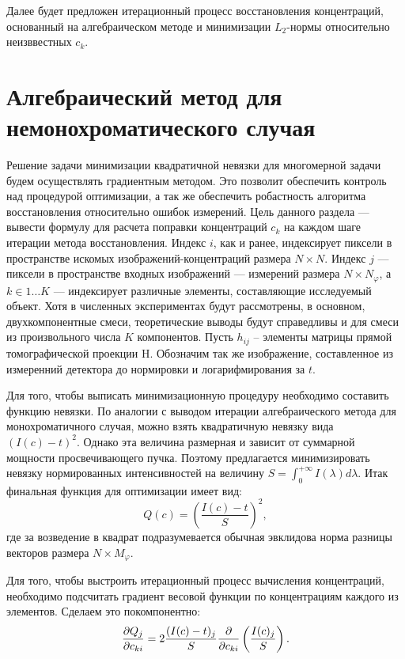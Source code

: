 Далее будет предложен итерационный процесс восстановления концентраций, основанный на алгебраическом методе и минимизации $L_2$-нормы относительно неизввестных $c_k$.

\section{Алгебраический метод для немонохроматического случая}
Решение задачи минимизации квадратичной невязки для многомерной задачи будем осуществлять градиентным методом.
Это позволит обеспечить контроль над процедурой оптимизации, а так же обеспечить робастность алгоритма восстановления относительно ошибок измерений.
Цель данного раздела --- вывести формулу для расчета поправки концентраций $c_k$ на каждом шаге итерации метода восстановления.
Индекс $i$, как и ранее, индексирует пиксели в пространстве искомых изображений-концентраций размера $N \times N$.
Индекс $j$ --- пиксели в пространстве входных изображений --- измерений размера $N \times N_\varphi$, а $k \in 1 \dots K$ --- индексирует различные элементы, составляющие исследуемый объект.
Хотя в численных экспериментах будут рассмотрены, в основном, двухкомпонентные смеси, теоретические выводы будут справедливы и для смеси из произвольного числа $K$ компонентов.
Пусть $h_{ij}$ – элементы матрицы прямой томографической проекции H.
Обозначим так же изображение, составленное из измеренний детектора до нормировки и логарифмирования за $t$.

Для того, чтобы выписать минимизационную процедуру необходимо составить функцию невязки.
По аналогии с выводом итерации алгебраического метода для монохроматичного случая, можно взять квадратичную невязку вида $(I(c) - t)^2$.
Однако эта величина размерная и зависит от суммарной мощности просвечивающего пучка.
Поэтому предлагается минимизировать невязку нормированных интенсивностей на величину $ S = \int_0^{+\infty}{I(\lambda)d\lambda}$.
Итак финальная функция для оптимизации имеет вид:
\begin{equation}
\label{eq:white_cost_function}
Q(c) = \left(\frac{I(c) - t}{S}\right)^2,
\end{equation} 
где за возведение в квадрат подразумевается обычная эвклидова норма разницы векторов размера $N \times M_\varphi$.

Для того, чтобы выстроить итерационный процесс вычисления концентраций, необходимо подсчитать градиент весовой функции по концентрациям каждого из элементов. 
Сделаем это покомпонентно:
\begin{equation}
  \notag
  \frac {\partial Q_j} {\partial c_{ki}} = 
  2 \frac {(I(c) - t)_j} {S} 
  \frac {\partial } {\partial c_{ki}}
  \left( \frac {I(c)_j} {S} \right).
\end{equation}

